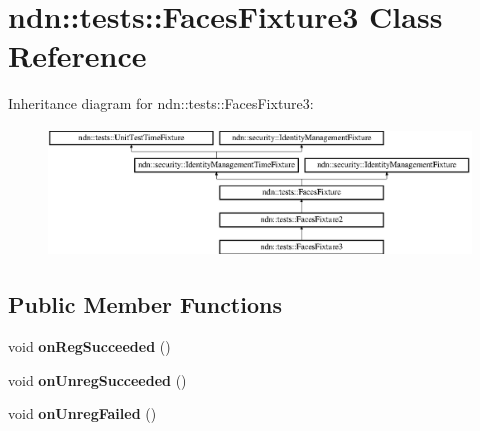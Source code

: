 \hypertarget{classndn_1_1tests_1_1FacesFixture3}{}\section{ndn\+:\+:tests\+:\+:Faces\+Fixture3 Class Reference}
\label{classndn_1_1tests_1_1FacesFixture3}
Inheritance diagram for ndn\+:\+:tests\+:\+:Faces\+Fixture3\+:\begin{figure}[H]
\begin{center}
\leavevmode
\includegraphics[height=3.393939cm]{classndn_1_1tests_1_1FacesFixture3}
\end{center}
\end{figure}
\subsection*{Public Member Functions}
\begin{DoxyCompactItemize}
\item 
void {\bfseries on\+Reg\+Succeeded} ()\hypertarget{classndn_1_1tests_1_1FacesFixture3_a346ea7486ba41d64d4de54159aa63970}{}\label{classndn_1_1tests_1_1FacesFixture3_a346ea7486ba41d64d4de54159aa63970}

\item 
void {\bfseries on\+Unreg\+Succeeded} ()\hypertarget{classndn_1_1tests_1_1FacesFixture3_ad19149ddd07e419497067790545d3f8e}{}\label{classndn_1_1tests_1_1FacesFixture3_ad19149ddd07e419497067790545d3f8e}

\item 
void {\bfseries on\+Unreg\+Failed} ()\hypertarget{classndn_1_1tests_1_1FacesFixture3_ac4b9437018c1ec5da42495432eb7c8b7}{}\label{classndn_1_1tests_1_1FacesFixture3_ac4b9437018c1ec5da42495432eb7c8b7}

\end{DoxyCompactItemize}
